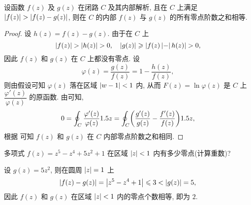 
\begin{theorem}[儒歇定理]
  \label{thm:rouche}
  设函数 $f(z)$ 及 $g(z)$ 在闭路 $C$ 及其内部解析, 且在 $C$ 上满足 $\abs{f(z)}>\abs{f(z)-g(z)}$, 则在 $C$ 的内部 $f(z)$ 与 $g(z)$ 的所有零点阶数之和相等.
\end{theorem}

\begin{proof}
  设 $h(z)=f(z)-g(z)$.
  由于在 $C$ 上
  \[
    \abs{f(z)}>\abs{h(z)}>0,\quad
    \abs{g(z)}\ge \abs{f(z)\abs{-}h(z)}>0,
  \]
  因此 $f(z)$ 和 $g(z)$ 在 $C$ 上都没有零点.
  设
  \[
    \varphi(z)=\frac{g(z)}{f(z)}=1-\frac{h(z)}{f(z)},
  \]
  则由假设可知 $\varphi(z)$ 落在区域 $\left|w-1\right|<1$ 内, 从而 $F(z)=\ln\varphi(z)$ 是 $C$ 上 $\dfrac{\varphi'(z)}{\varphi(z)}$ 的原函数.
  由\thmNL 可知,
  \[
     0
    =\oint_C \frac{\varphi'(z)}{\varphi(z)}1.5 z
    =\oint_C \biggl(\frac{g'(z)}{g(z)}-\frac{f'(z)}{f(z)}\biggr)1.5 z,
  \]
  根据 可知 $f(z)$ 和 $g(z)$ 在 $C$ 内部零点阶数之和相同.
\end{proof}

\begin{example}
  多项式 $f(z)=z^5-z^4+5z^2+1$ 在区域 $\left|z\right|<1$ 内有多少零点(计算重数)?
\end{example}

\begin{solution}
  设 $g(z)=5z^2$, 则在圆周 $\left|z\right|=1$ 上
  \[
    \left|f(z)-g(z)\right|=\left|z^5-z^4+1\right|\leqslant 3<\left|g(z)\right|=5,
  \]
  因此 $f(z)$ 和 $g(z)$ 在区域 $\left|z\right|<1$ 内的零点个数相等, 即为 $2$.
\end{solution}

